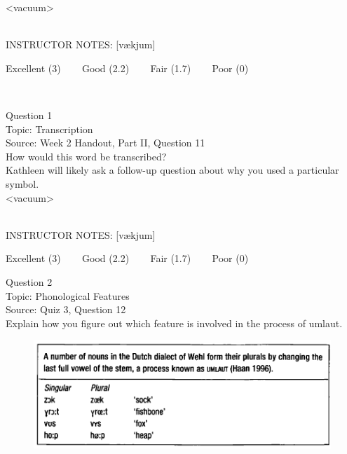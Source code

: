 \documentclass[12pt]{article}
\begin{document}
<vacuum>


~\\
INSTRUCTOR NOTES: [vækjum]


\vfill
Excellent (3) ~~~ Good (2.2) ~~~ Fair (1.7) ~~~ Poor (0)
\newpage

\begin{center}
\textbf{{\color{red}{\HUGE END OF EXAM}}}\\

\end{center}
\newpage

\begin{center}
\textbf{{\color{blue}{\HUGE START OF EXAM\\}}}

\textbf{{\color{blue}{\HUGE Student ID: 68058\\}}}

\textbf{{\color{blue}{\HUGE 4:20\\}}}

\end{center}
\newpage

{\large Question 1}\\

Topic: Transcription\\
Source: Week 2 Handout, Part II, Question 11\\

How would this word be transcribed?\\ Kathleen will likely ask a follow-up question about why you used a particular symbol.\\

<vacuum>


~\\
INSTRUCTOR NOTES: [vækjum]


\vfill
Excellent (3) ~~~ Good (2.2) ~~~ Fair (1.7) ~~~ Poor (0)
\newpage

{\large Question 2}\\

Topic: Phonological Features\\
Source: Quiz 3, Question 12\\

Explain how you figure out which feature is involved in the process of umlaut.\\

\begin{figure}[H]
\includegraphics{../images/dutch.png}
\end{figure}
\end{document}
